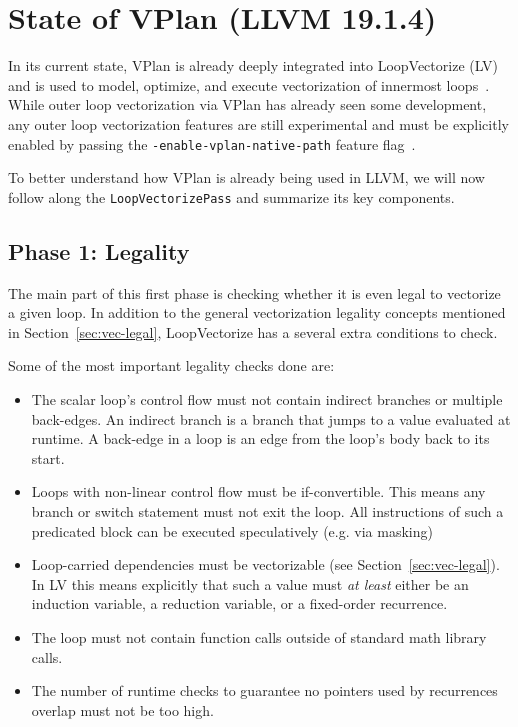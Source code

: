 \documentclass[sigplan,11pt,nonacm]{acmart}
\begin{document}
\section{State of VPlan (LLVM 19.1.4)}
In its current state, VPlan is already deeply integrated into LoopVectorize (LV) and is
used to model, optimize, and execute vectorization of innermost loops~\cite{llvmvplan,llvmintrvplan,llvmvplanupdate}. 
While outer loop vectorization via VPlan has already seen some development, any 
outer loop vectorization features are still experimental and must be explicitly enabled 
by passing the \texttt{-enable-\allowbreak vplan-\allowbreak native-\allowbreak path} 
feature flag~\cite{llvmouterloop,llvmouterloopstatus}.

To better understand how VPlan is already being used in LLVM, we will now follow along the 
\texttt{LoopVectorizePass} and summarize its key components.

\subsection{Phase 1: Legality}
The main part of this first phase is checking whether it is even legal to vectorize a given loop. 
In addition to the general vectorization legality concepts mentioned in 
Section~\ref{sec:vec-legal}, LoopVectorize has a several extra conditions to check.

Some of the most important legality checks done are:
\begin{itemize}
  \item The scalar loop's control flow must not contain indirect branches or multiple back-edges.
  An indirect branch is a branch that jumps to a value evaluated at runtime. A back-edge in a loop 
  is an edge from the loop's body back to its start. 
  \item Loops with non-linear control flow must be if-convertible. This means any branch or switch 
  statement must not exit the loop. All instructions of such a predicated block can be executed speculatively 
  (e.g. via masking)
  \item Loop-carried dependencies must be vectorizable (see Section~\ref{sec:vec-legal}). In LV 
  this means explicitly that such a value must \textit{at least} either be an induction variable, a reduction 
  variable, or a fixed-order recurrence.
  \item The loop must not contain function calls outside of standard math library calls.
  \item The number of runtime checks to guarantee no pointers used by recurrences overlap must not be too high.
\end{itemize}
\end{document}
